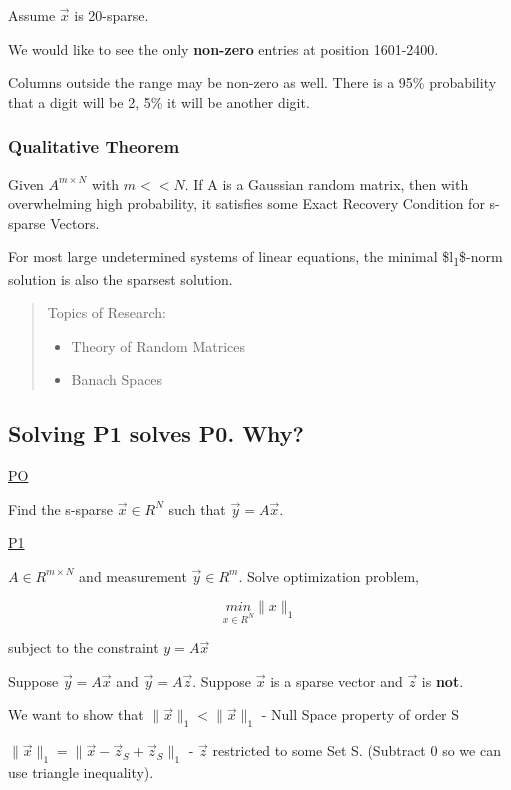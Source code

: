 \documentclass[11pt]{article}
\begin{document}
Assume \(\vec x\) is 20-sparse.

We would like to see the only \textbf{non-zero} entries at position 1601-2400.

Columns outside the range may be non-zero as well. There is a 95\% probability
that a digit will be 2, 5\% it will be another digit.


\subsubsection{Qualitative Theorem}
\label{sec:org83048f6}
Given \(A^{m \times N}\) with \(m << N\). If A is a Gaussian random matrix, then
with overwhelming high probability, it satisfies some Exact Recovery Condition
for s-sparse Vectors.

For most large undetermined systems of linear equations, the minimal \$l\textsubscript{1}\$-norm
solution is also the sparsest solution.

\begin{quote}
Topics of Research:
\begin{itemize}
\item Theory of Random Matrices
\item Banach Spaces
\end{itemize}
\end{quote}

\subsection{Solving P1 solves P0. Why?}
\label{sec:orgb39a962}
\uline{PO}

Find the s-sparse \(\vec x \in R^N\) such that \(\vec y = A \vec x\).

\uline{P1}

\(A \in R^{m \times N}\) and measurement \(\vec y \in R^m\). Solve optimization
problem,

$$
\underset{x \in R^{N}}{min} \| x\|_1
$$

subject to the constraint \(y = A \vec x\)


Suppose \(\vec y = A \vec x\) and \(\vec y = A \vec z\). Suppose \(\vec x\) is a
sparse vector and \(\vec z\) is \textbf{not}.

We want to show that \(\| \vec x \|_1 < \| \vec x \|_1\) - Null Space property of
order S

\(\| \vec x \|_1 = \| \vec x - \vec z_{S} + \vec z_S \|_1\) - \(\vec z\) restricted
to some Set S. (Subtract 0 so we can use triangle inequality).
\end{document}
